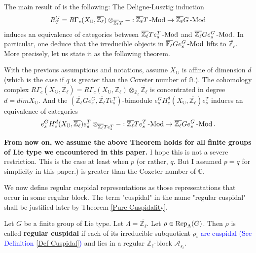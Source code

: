 	The main result of \cite{broue1990isometries} is the following: The Deligne-Lusztig induction 
	$$R_T^G=R\Gamma_c(X_{\mathbb{U}}, \overline{\mathbb{Z}_\ell})\otimes_{\overline{\mathbb{Z}_\ell}T}-: \overline{\mathbb{Z}_\ell}T\operatorname{-Mod} \to \overline{\mathbb{Z}_\ell}G\operatorname{-Mod}$$ induces an equivalence of categories between $\overline{\mathbb{Z}_\ell}Te_s^T\operatorname{-Mod}$ and $\overline{\mathbb{Z}_\ell}Ge_s^G\operatorname{-Mod}$. In particular, one deduce that the irreducible objects in $\overline{\mathbb{F}_\ell}Ge_s^G\operatorname{-Mod}$ lifts to $\overline{\mathbb{Z}_\ell}$. More precisely, let us state it as the following theorem.
	
	\begin{theorem}\label{Thm Broue}
		With the previous assumptions and notations, assume $X_{\mathbb{U}}$ is affine of dimension $d$ (which is the case if $q$ is greater than the Coxeter number of $\mathbb{G}$.). The cohomology complex $R\Gamma_c(X_{\mathbb{U}}, \overline{\mathbb{Z}_\ell})=R\Gamma_c(X_{\mathbb{U}}, {\mathbb{Z}_\ell}) \otimes_{\mathbb{Z}_\ell}$$\overline{\mathbb{Z}_\ell}$ is concentrated in degree $d=dimX_{\mathbb{U}}$. And the $(\overline{\mathbb{Z}_\ell}Ge_s^G, \overline{\mathbb{Z}_\ell}Te_s^T)$-bimodule $e_s^GH_c^d(X_{\mathbb{U}}, \overline{\mathbb{Z}_\ell})e_s^T$ induces an equivalence of categories
		$$e_s^GH_c^d(X_{\mathbb{U}}, \overline{\mathbb{Z}_\ell})e_s^T \otimes_{\overline{\mathbb{Z}_\ell}Te_s^T}-: \overline{\mathbb{Z}_\ell}Te_s^T\operatorname{-Mod} \to \overline{\mathbb{Z}_\ell}Ge_s^G\operatorname{-Mod}.$$
	\end{theorem}
	
	\textbf{From now on, we assume the above Theorem holds for all finite groups of Lie type we encountered in this paper.} I hope this is not a severe restriction. This is the case at least when $p$ (or rather, $q$. But I assumed $p=q$ for simplicity in this paper.) is greater than the Coxeter number of $\mathbb{G}$.
	
	We now define regular cuspidal representations as those representations that occur in some regular block. The term "cuspidal" in the name "regular cuspidal" shall be justified later by Theorem \ref{Pure Cuspidality}.
	
	\begin{definition}\label{Def regular cuspidal}
		Let $G$ be a finite group of Lie type. Let $\Lambda=\overline{\mathbb{Z}_{\ell}}$. Let $\rho \in \operatorname{\operatorname{Rep}}_{\Lambda}(G)$. Then $\rho$ is called \textbf{regular cuspidal} if each of its irreducible subquotient $\rho_i$ \textcolor{blue}{are cuspidal (See Definition \ref{Def Cuspidal})} and lies in a regular $\overline{\mathbb{Z}_{\ell}}$-block $\mathcal{A}_{s_i}$.
	\end{definition}
	
